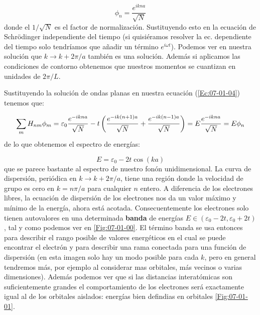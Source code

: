 \begin{equation}
	\phi_n = \frac{e^{ikna}}{\sqrt{N}}
\end{equation}
donde el $1/\sqrt{N}$ es el factor de normalización. Sustituyendo esto en la ecuación de Schrödinger independiente del tiempo (si quisiéramos resolver la ec. dependiente del tiempo solo tendríamos que añadir un término $e^{i\omega t}$). Podemos ver en nuestra solución que $k\rightarrow k + 2 \pi /a$ también es una solución. Además si aplicamos las condiciones de contorno obtenemos que nuestros momentos se cuantizan en unidades de $2\pi /L$. 

Sustituyendo la solución de ondas planas en nuestra ecuación (\ref{Ec:07-01-04}) tenemos que:

\begin{equation}
	\sum_m H_{nm} \phi_m = \varepsilon_0 \frac{e^{-ikna}}{\sqrt{N}} - t \left( \frac{e^{-ik(n+1)a}}{\sqrt{N}}+\frac{e^{-ik(n-1)a}}{\sqrt{N}} \right) = E \frac{e^{-ikna}}{\sqrt{N}} = E\phi_n
\end{equation}
de lo que obtenemos el espectro de energías:

\begin{equation}
	E=\varepsilon_0 - 2 t \cos (ka)
\end{equation}
que se parece bastante al espectro de nuestro fonón unidimensional. La curva de dispersión, periódica en $k\rightarrow k+2\pi/a$, tiene una región donde la velocidad de grupo es cero en $k=n\pi/a$ para cualquier $n$ entero. A diferencia de los electrones libres, la ecuación de dispersión de los electrones nos da un valor máximo y mínimo de la energía, ahora está acotada. Consecuentemente los electrones solo tienen autovalores en una determinada \textbf{banda} de energías $E\in (\varepsilon_0-2t,\varepsilon_0+2t)$, tal y como podemos ver en \ref{Fig:07-01-00}. El término banda se usa entonces para describir el rango posible de valores energéticos en el cual se puede encontrar el electrón y para describir una rama conectada para una función de dispersión (en esta imagen solo hay un modo posible para cada $k$, pero en general tendremos más, por ejemplo al considerar mas orbitales, más vecinos o varias dimensiones). Además podemos ver que si las distancias interatómicas son suficientemente grandes el comportamiento de los electrones será exactamente igual al de los orbitales aislados: energías bien defindias en orbitales \ref{Fig:07-01-01}.


